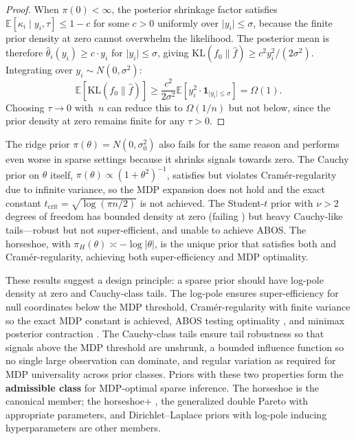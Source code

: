 \documentclass[12pt]{article}
\newcommand{\E}{\mathbb{E}}
\newcommand{\KL}{\mathrm{KL}}
\newcommand{\abs}[1]{\lvert #1 \rvert}
\newcommand{\piH}{\pi_H}
\newcommand{\tcrit}{t_{\mathrm{crit}}}
\begin{document}
\begin{proof}
When $\pi(0) < \infty$, the posterior shrinkage factor satisfies $\E[\kappa_i \mid y_i, \tau] \leq 1 - c$ for some $c > 0$ uniformly over $\abs{y_i} \leq \sigma$, because the finite prior density at zero cannot overwhelm the likelihood. The posterior mean is therefore $\hat{\theta}_i(y_i) \geq c \cdot y_i$ for $\abs{y_i} \leq \sigma$, giving $\KL(f_0 \| \hat{f}) \geq c^2 y_i^2/(2\sigma^2)$. Integrating over $y_i \sim N(0, \sigma^2)$:
\[
  \E[\KL(f_0 \| \hat{f})] \geq \frac{c^2}{2\sigma^2}\E[y_i^2 \cdot \mathbf{1}_{\abs{y_i} \leq \sigma}] = \Omega(1).
\]
Choosing $\tau \to 0$ with~$n$ can reduce this to $\Omega(1/n)$ but not below, since the prior density at zero remains finite for any $\tau > 0$.
\end{proof}

The ridge prior $\pi(\theta) = N(0, \sigma_0^2)$ also fails  for the same reason and performs even worse in sparse settings because it shrinks signals towards zero. The Cauchy prior on $\theta$ itself, $\pi(\theta) \propto (1+\theta^2)^{-1}$, satisfies  but violates Cram\'er-regularity due to infinite variance, so the MDP expansion does not hold and the exact constant $\tcrit = \sqrt{\log(\pi n/2)}$ is not achieved. The Student-$t$ prior with $\nu > 2$ degrees of freedom has bounded density at zero (failing ) but heavy Cauchy-like tails---robust but not super-efficient, and unable to achieve ABOS. The horseshoe, with $\piH(\theta) \asymp -\log\abs{\theta}$, is the unique prior that satisfies both  and Cram\'er-regularity, achieving both super-efficiency and MDP optimality.

These results suggest a design principle: a sparse prior should have log-pole density at zero and Cauchy-class tails. The log-pole ensures super-efficiency for null coordinates below the MDP threshold, Cram\'er-regularity with finite variance so the exact MDP constant is achieved, ABOS testing optimality \citep{datta2013asymptotic}, and minimax posterior contraction \citep{vanderpas2014horseshoe,vanderpas2016conditions}. The Cauchy-class tails ensure tail robustness so that signals above the MDP threshold are unshrunk, a bounded influence function so no single large observation can dominate, and regular variation as required for MDP universality across prior classes. Priors with these two properties form the \textbf{admissible class} for MDP-optimal sparse inference. The horseshoe is the canonical member; the horseshoe+ \citep{bhadra2017horseshoe}, the generalized double Pareto with appropriate parameters, and Dirichlet--Laplace priors with log-pole inducing hyperparameters \citep{bhattacharya2015dirichlet} are other members.
\end{document}
